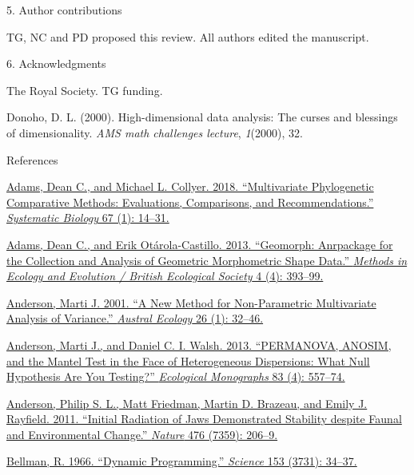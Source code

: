 5. Author contributions

TG, NC and PD proposed this review. All authors edited the manuscript.

6. Acknowledgments

The Royal Society. TG funding.

Donoho, D. L. (2000). High-dimensional data analysis: The curses and
blessings of dimensionality. \emph{AMS math challenges lecture},
\emph{1}(2000), 32.

References

\href{http://paperpile.com/b/sTGYvp/ZnDd}{Adams, Dean C., and Michael L.
Collyer. 2018. ``Multivariate Phylogenetic Comparative Methods:
Evaluations, Comparisons, and Recommendations.''
}\href{http://paperpile.com/b/sTGYvp/ZnDd}{\emph{Systematic
Biology}}\href{http://paperpile.com/b/sTGYvp/ZnDd}{ 67 (1): 14--31.}

\href{http://paperpile.com/b/sTGYvp/J2G1}{Adams, Dean C., and Erik
Otárola-Castillo. 2013. ``Geomorph: Anrpackage for the Collection and
Analysis of Geometric Morphometric Shape Data.''
}\href{http://paperpile.com/b/sTGYvp/J2G1}{\emph{Methods in Ecology and
Evolution / British Ecological
Society}}\href{http://paperpile.com/b/sTGYvp/J2G1}{ 4 (4): 393--99.}

\href{http://paperpile.com/b/sTGYvp/SC6L}{Anderson, Marti J. 2001. ``A
New Method for Non-Parametric Multivariate Analysis of Variance.''
}\href{http://paperpile.com/b/sTGYvp/SC6L}{\emph{Austral
Ecology}}\href{http://paperpile.com/b/sTGYvp/SC6L}{ 26 (1): 32--46.}

\href{http://paperpile.com/b/sTGYvp/3hy2}{Anderson, Marti J., and Daniel
C. I. Walsh. 2013. ``PERMANOVA, ANOSIM, and the Mantel Test in the Face
of Heterogeneous Dispersions: What Null Hypothesis Are You Testing?''
}\href{http://paperpile.com/b/sTGYvp/3hy2}{\emph{Ecological
Monographs}}\href{http://paperpile.com/b/sTGYvp/3hy2}{ 83 (4): 557--74.}

\href{http://paperpile.com/b/sTGYvp/qjj9}{Anderson, Philip S. L., Matt
Friedman, Martin D. Brazeau, and Emily J. Rayfield. 2011. ``Initial
Radiation of Jaws Demonstrated Stability despite Faunal and
Environmental Change.''
}\href{http://paperpile.com/b/sTGYvp/qjj9}{\emph{Nature}}\href{http://paperpile.com/b/sTGYvp/qjj9}{
476 (7359): 206--9.}

\href{http://paperpile.com/b/sTGYvp/Qsl3}{Bellman, R. 1966. ``Dynamic
Programming.''
}\href{http://paperpile.com/b/sTGYvp/Qsl3}{\emph{Science}}\href{http://paperpile.com/b/sTGYvp/Qsl3}{
153 (3731): 34--37.}

